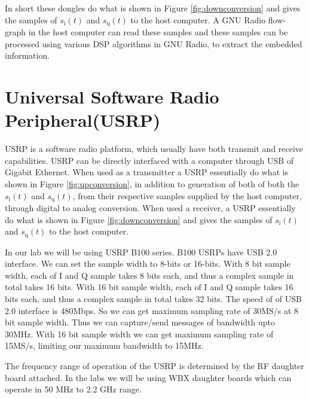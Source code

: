 \documentclass[a4paper,10pt]{article}
\begin{document}
In short these dongles do what is shown in Figure \ref{fig:downconversion}
and gives the samples of $s_{\text{i}}(t)$ and $s_{\text{q}}(t)$ to the host computer.
A GNU Radio flow-graph in the host computer can read these samples and these samples can be processed using various DSP algorithms in GNU Radio,
to extract the embedded information.

\section{Universal Software Radio Peripheral(USRP)\cite{bib:usrp}}
USRP is a software radio platform, which usually have both transmit and receive capabilities.
USRP can be directly interfaced with a computer through USB of Gigabit Ethernet.
When used as a transmitter a USRP essentially do what is shown in Figure \ref{fig:upconversion},
in addition to generation of both of both the $s_{\text{i}}(t)$ and $s_{\text{q}}(t)$,
from their respective samples supplied by the host computer, through digital to analog conversion.
When used a receiver, a USRP essentially do what is shown in Figure \ref{fig:downconversion} and
gives the samples of $s_{\text{i}}(t)$ and $s_{\text{q}}(t)$ to the host computer.

In our lab we will be using USRP B100 series. B100 USRPs have USB 2.0 interface.
We can set the sample width to 8-bits or 16-bits.
With 8 bit sample width, each of I and Q sample takes 8 bits each, and thus a complex sample in total takes 16 bits.
With 16 bit sample width, each of I and Q sample takes 16 bits each, and thus a complex sample in total takes 32 bits.
The speed of of USB 2.0 interface is 480Mbps.
So we can get maximum sampling rate of 30MS/s at 8 bit sample width.
Thus we can capture/send messages of bandwidth upto 30MHz.
With 16 bit sample width we can get maximum sampling rate of 15MS/s,
limiting our maximum bandwidth to 15MHz.

The frequency range of operation of the USRP is determined by the RF daughter board attached.
In the labs we will be using WBX daughter boards which can operate in 50 MHz to 2.2 GHz range.
\end{document}
